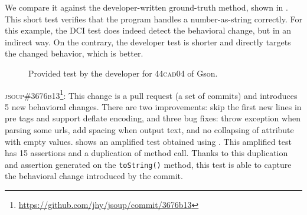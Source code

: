 We compare it against the developer-written ground-truth method, shown in . 
This short test verifies that the program handles a number-as-string correctly.
For this example, the DCI test does indeed detect the behavioral change, but in an indirect way.
On the contrary, the developer test is shorter and directly targets the changed behavior, which is better.

\begin{figure}[h]
\centering
{}
\caption{Provided test by the developer for \textsc{44cad04} of Gson.}
\label{fig:diff_gson}
\end{figure}



\textsc{jsoup\#3676b13}\footnote{\url{https://github.com/jhy/jsoup/commit/3676b13}}: This change is a pull request (\ie a set of commits) and introduces 5 new behavioral changes. There are two improvements: skip the first new lines in pre tags and support deflate encoding, and three bug fixes: throw exception when parsing some urls, add spacing when output text, and no collapsing of attribute with empty values.
 shows an amplified test obtained using \DCII.
This amplified test has 15 assertions and a duplication of method call.
Thanks to this duplication and assertion generated on the \texttt{toString()} method, this test is able to capture the behavioral change introduced by the commit.

